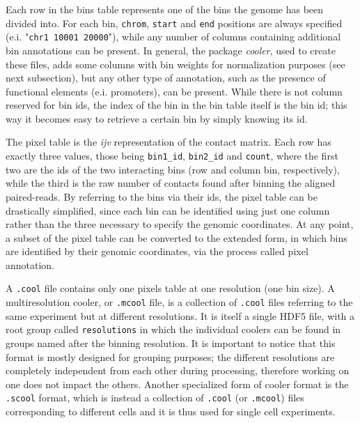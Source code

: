 Each row in the bins table represents one of the bins the genome has been divided into. For each bin, \texttt{chrom}, \texttt{start} and \texttt{end} positions are always specified (e.i. "\texttt{chr1  10001  20000}"), while any number of columns containing additional bin annotations can be present. In general, the package \emph{cooler}, used to create these files, adds some columns with bin weights for normalization purposes (see next subsection), but any other type of annotation, such as the presence of functional elements (e.i. promoters), can be present. While there is not column reserved for bin ids, the index of the bin in the bin table itself is the bin id; this way it becomes easy to retrieve a certain bin by simply knowing its id.

The pixel table is the \emph{ijv} representation of the contact matrix. Each row has exactly three values, those being \texttt{bin1\_id}, \texttt{bin2\_id} and \texttt{count}, where the first two are the ids of the two interacting bins (row and column bin, respectively), while the third is the raw number of contacts found after binning the aligned paired-reads. By referring to the bins via their ids, the pixel table can be drastically simplified, since each bin can be identified using just one column rather than the three necessary to specify the genomic coordinates. At any point, a subset of the pixel table can be converted to the extended form, in which bins are identified by their genomic coordinates, via the process called pixel annotation.

A \texttt{.cool} file contains only one pixels table at one resolution (one bin size). A multiresolution cooler, or \texttt{.mcool} file, is a collection of \texttt{.cool} files referring to the same experiment but at different resolutions. It is itself a single HDF5 file, with a root group called \texttt{resolutions} in which the individual coolers can be found in groups named after the binning resolution. It is important to notice that this format is mostly designed for grouping purposes; the different resolutions are completely independent from each other during processing, therefore working on one does not impact the others. Another specialized form of cooler format is the \texttt{.scool} format, which is instead a collection of \texttt{.cool} (or \texttt{.mcool}) files corresponding to different cells and it is thus used for single cell experiments. 


